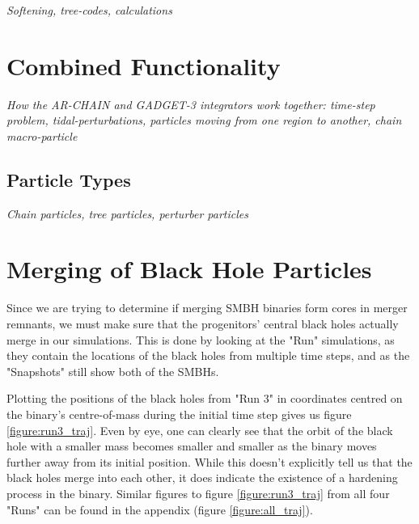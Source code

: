 \documentclass[english, oneside]{HYgradu}
\begin{document}
\textit{Softening, tree-codes, calculations}

\section{Combined Functionality}

\textit{How the AR-CHAIN and GADGET-3 integrators work together: time-step problem, tidal-perturbations, particles moving from one region to another, chain macro-particle}

\subsection{Particle Types}

\textit{Chain particles, tree particles, perturber particles}

\section{Merging of Black Hole Particles}

Since we are trying to determine if merging SMBH binaries form cores in merger remnants, we must make sure that the progenitors' central black holes actually merge in our simulations. This is done by looking at the "Run" simulations, as they contain the locations of the black holes from multiple time steps, and as the "Snapshots" still show both of the SMBHs.

Plotting the positions of the black holes from "Run 3" in coordinates centred on the binary's centre-of-mass during the initial time step gives us figure \ref{figure:run3_traj}. Even by eye, one can clearly see that the orbit of the black hole with a smaller mass becomes smaller and smaller as the binary moves further away from its initial position. While this doesn't explicitly tell us that the black holes merge into each other, it does indicate the existence of a hardening process in the binary. Similar figures to figure \ref{figure:run3_traj} from all four "Runs" can be found in the appendix (figure \ref{figure:all_traj}).
\end{document}

